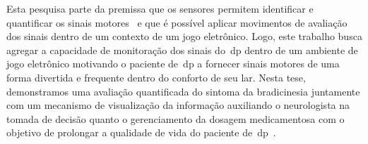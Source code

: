 Esta pesquisa parte da premissa que os sensores permitem identificar e quantificar os sinais motores~\cite{patel_monitoring_2009,visionbased2009,bachlin_parkinsons_2009} e que é possível aplicar movimentos de avaliação dos sinais dentro de um contexto de um jogo eletrônico. Logo, este trabalho busca agregar a capacidade de monitoração dos sinais do~\ac{dp} dentro de um ambiente de jogo eletrônico motivando o paciente de~\ac{dp} a fornecer sinais motores de uma forma divertida e frequente dentro do conforto de seu lar. Nesta tese, demonstramos uma avaliação quantificada do sintoma da bradicinesia juntamente com um mecanismo de visualização da informação auxiliando o neurologista na tomada de decisão quanto o gerenciamento da dosagem medicamentosa com o objetivo de prolongar a qualidade de vida do paciente de~\ac{dp}~\cite{national2006parkinson}. 





